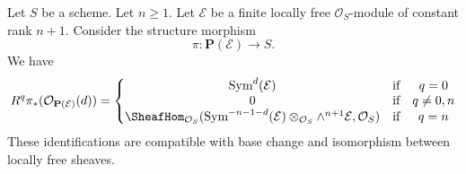 %
\begin{lemma}
\label{lemma-cohomology-projective-bundle}
Let $S$ be a scheme. Let $n \geq 1$.
Let $\mathcal{E}$ be a finite locally
free $\mathcal{O}_S$-module of constant rank $n + 1$.
Consider the structure morphism
$$
\pi : \mathbf{P}(\mathcal{E}) \longrightarrow S.
$$
We have
$$
R^q\pi_*(\mathcal{O}_{\mathbf{P}(\mathcal{E})}(d)) =
\left\{
\begin{matrix}
\text{Sym}^d(\mathcal{E}) & \text{if} & q = 0 \\
0 & \text{if} & q \not = 0, n \\
\SheafHom_{\mathcal{O}_S}(
\text{Sym}^{- n - 1 - d}(\mathcal{E})
\otimes_{\mathcal{O}_S}
\wedge^{n + 1}\mathcal{E},
\mathcal{O}_S)
& \text{if} & q = n
\end{matrix}
\right.
$$
These identifications are compatible with base change and
isomorphism between locally free sheaves.
\end{lemma}

